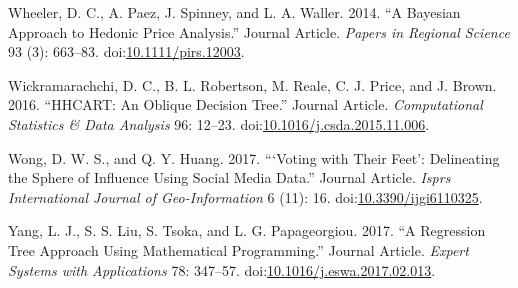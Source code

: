 \documentclass[]{elsarticle} %
\begin{document}
\hypertarget{ref-Wheeler2014}{}
Wheeler, D. C., A. Paez, J. Spinney, and L. A. Waller. 2014. ``A
Bayesian Approach to Hedonic Price Analysis.'' Journal Article.
\emph{Papers in Regional Science} 93 (3): 663--83.
doi:\href{https://doi.org/10.1111/pirs.12003}{10.1111/pirs.12003}.

\hypertarget{ref-Wickramarachchi2016}{}
Wickramarachchi, D. C., B. L. Robertson, M. Reale, C. J. Price, and J.
Brown. 2016. ``HHCART: An Oblique Decision Tree.'' Journal Article.
\emph{Computational Statistics \& Data Analysis} 96: 12--23.
doi:\href{https://doi.org/10.1016/j.csda.2015.11.006}{10.1016/j.csda.2015.11.006}.

\hypertarget{ref-Wong2017}{}
Wong, D. W. S., and Q. Y. Huang. 2017. ```Voting with Their Feet':
Delineating the Sphere of Influence Using Social Media Data.'' Journal
Article. \emph{Isprs International Journal of Geo-Information} 6 (11):
16. doi:\href{https://doi.org/10.3390/ijgi6110325}{10.3390/ijgi6110325}.

\hypertarget{ref-Yang2017}{}
Yang, L. J., S. S. Liu, S. Tsoka, and L. G. Papageorgiou. 2017. ``A
Regression Tree Approach Using Mathematical Programming.'' Journal
Article. \emph{Expert Systems with Applications} 78: 347--57.
doi:\href{https://doi.org/10.1016/j.eswa.2017.02.013}{10.1016/j.eswa.2017.02.013}.
\end{document}
